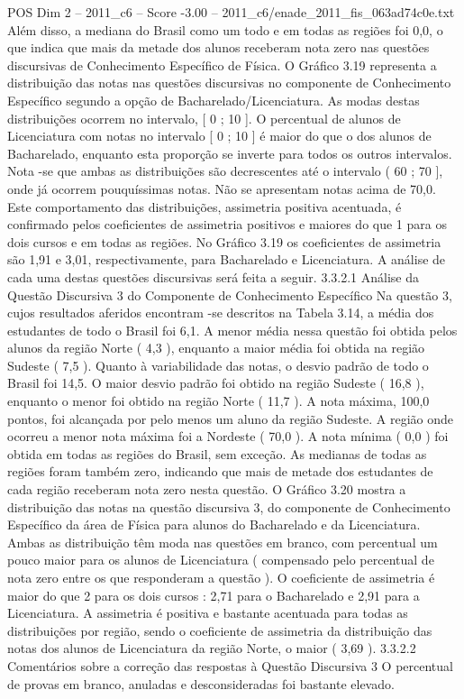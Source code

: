 \begin{textsample}{POS Dim 2 – 2011\_c6 – Score -3.00 – 2011\_c6/enade\_2011\_fis\_063ad74c0e.txt}
Além disso, a mediana do Brasil como um todo e em todas as regiões foi 0,0, o que indica que mais da metade dos alunos receberam nota zero nas questões discursivas de Conhecimento Específico de Física.
O Gráfico 3.19 representa a distribuição das notas nas questões discursivas no componente de Conhecimento Específico segundo a opção de Bacharelado/Licenciatura.
As modas destas distribuições ocorrem no intervalo, [ 0 ; 10 ].
O percentual de alunos de Licenciatura com notas no intervalo [ 0 ; 10 ] é maior do que o dos alunos de Bacharelado, enquanto esta proporção se inverte para todos os outros intervalos.
Nota -se que ambas as distribuições são decrescentes até o intervalo ( 60 ; 70 ], onde já ocorrem pouquíssimas notas.
Não se apresentam notas acima de 70,0.
Este comportamento das distribuições, assimetria positiva acentuada, é confirmado pelos coeficientes de assimetria positivos e maiores do que 1 para os dois cursos e em todas as regiões.
No Gráfico 3.19 os coeficientes de assimetria são 1,91 e 3,01, respectivamente, para Bacharelado e Licenciatura.
A análise de cada uma destas questões discursivas será feita a seguir. 3.3.2.1 Análise da Questão Discursiva 3 do Componente de Conhecimento Específico Na questão 3, cujos resultados aferidos encontram -se descritos na Tabela 3.14, a média dos estudantes de todo o Brasil foi 6,1.
A menor média nessa questão foi obtida pelos alunos da região Norte ( 4,3 ), enquanto a maior média foi obtida na região Sudeste ( 7,5 ).
Quanto à variabilidade das notas, o desvio padrão de todo o Brasil foi 14,5.
O maior desvio padrão foi obtido na região Sudeste ( 16,8 ), enquanto o menor foi obtido na região Norte ( 11,7 ).
A nota máxima, 100,0 pontos, foi alcançada por pelo menos um aluno da região Sudeste.
A região onde ocorreu a menor nota máxima foi a Nordeste ( 70,0 ).
A nota mínima ( 0,0 ) foi obtida em todas as regiões do Brasil, sem exceção.
As medianas de todas as regiões foram também zero, indicando que mais de metade dos estudantes de cada região receberam nota zero nesta questão.
O Gráfico 3.20 mostra a distribuição das notas na questão discursiva 3, do componente de Conhecimento Específico da área de Física para alunos do Bacharelado e da Licenciatura.
Ambas as distribuição têm moda nas questões em branco, com percentual um pouco maior para os alunos de Licenciatura ( compensado pelo percentual de nota zero entre os que responderam a questão ).
O coeficiente de assimetria é maior do que 2 para os dois cursos : 2,71 para o Bacharelado e 2,91 para a Licenciatura.
A assimetria é positiva e bastante acentuada para todas as distribuições por região, sendo o coeficiente de assimetria da distribuição das notas dos alunos de Licenciatura da região Norte, o maior ( 3,69 ). 3.3.2.2 Comentários sobre a correção das respostas à Questão Discursiva 3 O percentual de provas em branco, anuladas e desconsideradas foi bastante elevado.

\end{textsample}
